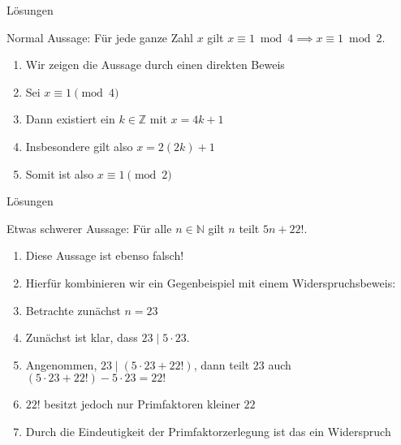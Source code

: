{
\begin{frame}[fragile]{Lösungen}   
    \begin{block}{Normal}
        Aussage: Für jede ganze Zahl $x$ gilt $x\equiv 1\bmod 4 \implies x\equiv 1\bmod 2$.
        \begin{enumerate}
            \item<2-> Wir zeigen die Aussage durch einen direkten Beweis 
            \item<3-> Sei $x \equiv 1 \pmod{4}$
            \item<4-> Dann existiert ein $k \in \mathbb{Z}$ mit $x = 4k + 1$
            \item<5-> Insbesondere gilt also $x = 2(2k)+1$
            \item<6-> Somit ist also $x \equiv 1 \pmod{2}$
        \end{enumerate}
    \end{block}
\end{frame}
}

{
\begin{frame}[fragile]{Lösungen}   
    \begin{block}{Etwas schwerer}
        Aussage: Für alle $n \in \mathbb{N}$ gilt $n$ teilt $5n + 22!$.
        \begin{enumerate}
            \item<2-> Diese Aussage ist ebenso falsch!
            \item<3-> Hierfür kombinieren wir ein Gegenbeispiel mit einem Widerspruchsbeweis:
            \item<4-> Betrachte zunächst $n = 23$
            \item<5-> Zunächst ist klar, dass $23 \mid 5\cdot23$.
            \item<6-> Angenommen, $23 \mid (5\cdot23 + 22!)$, dann teilt $23$ auch $(5\cdot23+22!)-5\cdot23 = 22!$
            \item<7-> $22!$ besitzt jedoch nur Primfaktoren kleiner $22$
            \item<8-> Durch die Eindeutigkeit der Primfaktorzerlegung ist das ein Widerspruch
        \end{enumerate}
    \end{block}
\end{frame}
}
